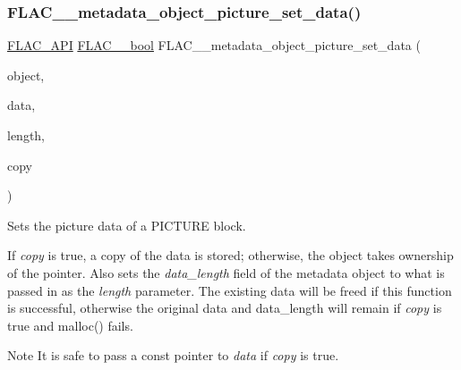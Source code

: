 \subsubsection{\texorpdfstring{FLAC\_\_metadata\_object\_picture\_set\_data()}{FLAC\_\_metadata\_object\_picture\_set\_data()}}
{\footnotesize\ttfamily \mbox{\hyperlink{group__flac__export_ga56ca07df8a23310707732b1c0007d6f5}{F\+L\+A\+C\+\_\+\+A\+PI}} \mbox{\hyperlink{ordinals_8h_a95103469f1cbd78b8cf250194985b34e}{F\+L\+A\+C\+\_\+\+\_\+bool}} F\+L\+A\+C\+\_\+\+\_\+metadata\+\_\+object\+\_\+picture\+\_\+set\+\_\+data (\begin{DoxyParamCaption}\item[{\mbox{\hyperlink{struct_f_l_a_c_____stream_metadata}{F\+L\+A\+C\+\_\+\+\_\+\+Stream\+Metadata}} $\ast$}]{object,  }\item[{\mbox{\hyperlink{ordinals_8h_a5eb569b12d5b047cdacada4d57924ee3}{F\+L\+A\+C\+\_\+\+\_\+byte}} $\ast$}]{data,  }\item[{\mbox{\hyperlink{ordinals_8h_a9c4005ea7ef8d564b0cc993cdd0e4e5e}{F\+L\+A\+C\+\_\+\+\_\+uint32}}}]{length,  }\item[{\mbox{\hyperlink{ordinals_8h_a95103469f1cbd78b8cf250194985b34e}{F\+L\+A\+C\+\_\+\+\_\+bool}}}]{copy }\end{DoxyParamCaption})}

Sets the picture data of a P\+I\+C\+T\+U\+RE block.

If {\itshape copy} is {\ttfamily true}, a copy of the data is stored; otherwise, the object takes ownership of the pointer. Also sets the {\itshape data\+\_\+length} field of the metadata object to what is passed in as the {\itshape length} parameter. The existing data will be freed if this function is successful, otherwise the original data and data\+\_\+length will remain if {\itshape copy} is {\ttfamily true} and malloc() fails.

\begin{DoxyNote}{Note}
It is safe to pass a const pointer to {\itshape data} if {\itshape copy} is {\ttfamily true}.
\end{DoxyNote}

